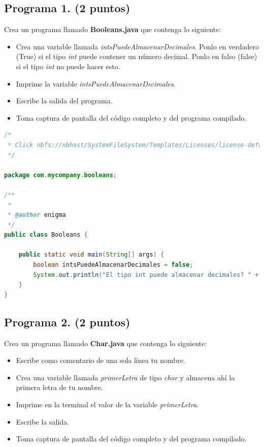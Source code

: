 \documentclass{article}
\begin{document}
\subsection*{Programa 1. (2 puntos)}
Crea un programa llamado \textbf{Booleans.java} que contenga lo siguiente:

\begin{itemize}
    \item Crea una variable llamada \textit{intsPuedeAlmacenarDecimales}. Ponlo en verdadero (True) si el tipo \textit{int} puede contener un número decimal. Ponlo en falso (false) si el tipo \textit{int} no puede hacer esto.
    \item Imprime la variable \textit{intsPuedeAlmacenarDecimales}.
    \item Escribe la salida del programa.
    \item Toma captura de pantalla del código completo y del programa compilado.
\end{itemize}

\begin{lstlisting}[language=Java, caption={Código del programa Booleans.java}]
/*
 * Click nbfs://nbhost/SystemFileSystem/Templates/Licenses/license-default.txt to change this license
 */

package com.mycompany.booleans;

/**
 *
 * @author enigma
 */
public class Booleans {

    public static void main(String[] args) {
        boolean intsPuedeAlmacenarDecimales = false;
        System.out.println("El tipo int puede almacenar decimales? " + intsPuedeAlmacenarDecimales);
    }
}
\end{lstlisting}

\newpage

\subsection*{Programa 2. (2 puntos)}
Crea un programa llamado \textbf{Char.java} que contenga lo siguiente:

\begin{itemize}
    \item Escribe como comentario de una sola línea tu nombre.
    \item Crea una variable llamada \textit{primerLetra} de tipo \textit{char} y almacena ahí la primera letra de tu nombre.
    \item Imprime en la terminal el valor de la variable \textit{primerLetra}.
    \item Escribe la salida.
    \item Toma captura de pantalla del código completo y del programa compilado.
\end{itemize}
\end{document}
